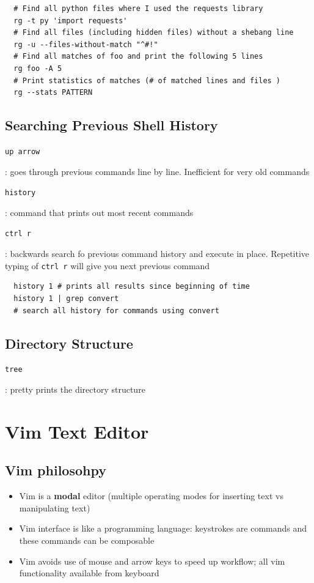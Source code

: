 \documentclass[letterpaper,12pt]{article}
\newcommand*{\lstitem}[1]{
  \setbox0\hbox{\lstinline{#1}}
  \item[\usebox0]
}
\begin{document}
\begin{lstlisting}
  # Find all python files where I used the requests library
  rg -t py 'import requests'
  # Find all files (including hidden files) without a shebang line
  rg -u --files-without-match "^#!"
  # Find all matches of foo and print the following 5 lines
  rg foo -A 5
  # Print statistics of matches (# of matched lines and files )
  rg --stats PATTERN
\end{lstlisting}

\subsection{Searching Previous Shell History}

\begin{description}
 \lstitem{up arrow}: goes through previous commands line by line. Inefficient for very old commands
 \lstitem{history}: command that prints out most recent commands
 \lstitem{ctrl r}: backwards search fo previous command history and execute in place. Repetitive typing of \lstinline{ctrl r}  will give you next previous command
\end{description}

\begin{lstlisting}
  history 1 # prints all results since beginning of time
  history 1 | grep convert
  # search all history for commands using convert
\end{lstlisting}


\subsection{Directory Structure}
\begin{description}
 \lstitem{tree}: pretty prints the directory structure
\end{description}

\section{Vim Text Editor}

\subsection{Vim philosohpy}
\begin{itemize}
 \item Vim is a \textbf{modal} editor (multiple operating modes for inserting text vs manipulating text)
 \item Vim interface is like a programming language: keystrokes are commands and these commands can be composable
 \item Vim avoids use of mouse and arrow keys to speed up workflow; all vim functionality available from keyboard
\end{itemize}
\end{document}

